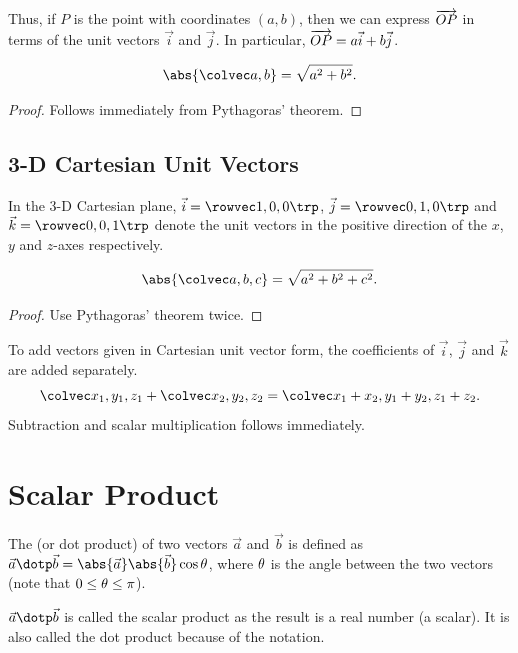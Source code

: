 Thus, if $P$ is the point with coordinates $(a, b)$, then we can express $\overrightarrow{OP}$ in terms of the unit vectors $\vec i$ and $\vec j$. In particular, $\overrightarrow{OP} = a\vec i + b \vec j$.

\begin{proposition}[Magnitude in 2-D]
    \[\abs{\cvecii{a}{b}} = \sqrt{a^2 + b^2}.\]
\end{proposition}
\begin{proof}
    Follows immediately from Pythagoras' theorem.
\end{proof}

\subsection{3-D Cartesian Unit Vectors}

\begin{definition}
    In the 3-D Cartesian plane, $\vec i = \cveciiix100$, $\vec j = \cveciiix010$ and $\vec k = \cveciiix001$ denote the unit vectors in the positive direction of the $x$, $y$ and $z$-axes respectively.
\end{definition}

\begin{proposition}[Magnitude in 3-D]
    \[\abs{\cveciii{a}{b}{c}} = \sqrt{a^2 + b^2 + c^2}.\]
\end{proposition}
\begin{proof}
    Use Pythagoras' theorem twice.
\end{proof}

\begin{fact}
    To add vectors given in Cartesian unit vector form, the coefficients of $\vec i$, $\vec j$ and $\vec k$ are added separately. \[\cveciii{x_1}{y_1}{z_1} + \cveciii{x_2}{y_2}{z_2} = \cveciii{x_1+x_2}{y_1+y_2}{z_1+z_2}.\] Subtraction and scalar multiplication follows immediately.
\end{fact}

\section{Scalar Product}

\begin{definition}
    The  (or dot product) of two vectors $\vec a$ and $\vec b$ is defined as $\vec a \dotp \vec b = \abs{\vec a} \abs{\vec b} \cos{\t}$, where $\theta$ is the angle between the two vectors (note that $0 \leq \theta \leq \pi$).
\end{definition}
\begin{remark}
    $\vec a \dotp \vec b$ is called the scalar product as the result is a real number (a scalar). It is also called the dot product because of the notation.
\end{remark}

